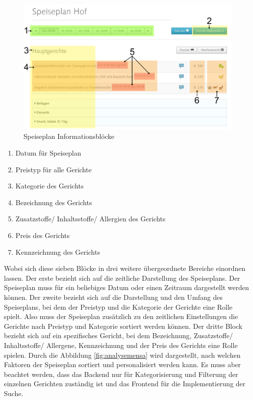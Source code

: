 \begin{figure}[H]
\centering
\includegraphics[width=\pictureWidth cm + 2cm]{Bilder/Sonstiges/Speiseplan_Infoblock.pdf}
\caption{Speiseplan Informationsblöcke\label{fig:swo_speiseplan}\protect\footnotemark}
\end{figure}


\begin{enumerate}
\item Datum für Speiseplan
\item Preistyp für alle Gerichte
\item Kategorie des Gerichts
\item Bezeichnung des Gerichts
\item Zusatzstoffe/ Inhaltsstoffe/ Allergien des Gerichts
\item Preis des Gerichts
\item Kennzeichnung des Gerichts
\end{enumerate}

Wobei sich diese sieben Blöcke in drei weitere übergeordnete Bereiche einordnen lassen. Der erste bezieht sich auf die zeitliche Darstellung des Speiseplans. Der Speiseplan muss für ein beliebiges Datum oder einen Zeitraum dargestellt werden können. Der zweite bezieht sich auf die Darstellung und den Umfang des Speiseplans, bei dem der Preistyp und die Kategorie der Gerichte eine Rolle spielt. Also muss der Speiseplan zusätzlich zu den zeitlichen Einstellungen die Gerichte nach Preistyp und Kategorie sortiert werden können. Der dritte Block bezieht sich auf ein spezifisches Gericht, bei dem Bezeichnung, Zusatzstoffe/ Inhaltsstoffe/ Allergene, Kennzeichnung und der Preis des Gerichts eine Rolle spielen. Durch die Abbildung \ref{fig:analysemensa} wird dargestellt, nach welchen Faktoren der Speiseplan sortiert und personalisiert werden kann. Es muss aber beachtet werden, dass das Backend nur für Kategorisierung und Filterung der einzelnen Gerichten zuständig ist und das Frontend für die Implementierung der Suche.

